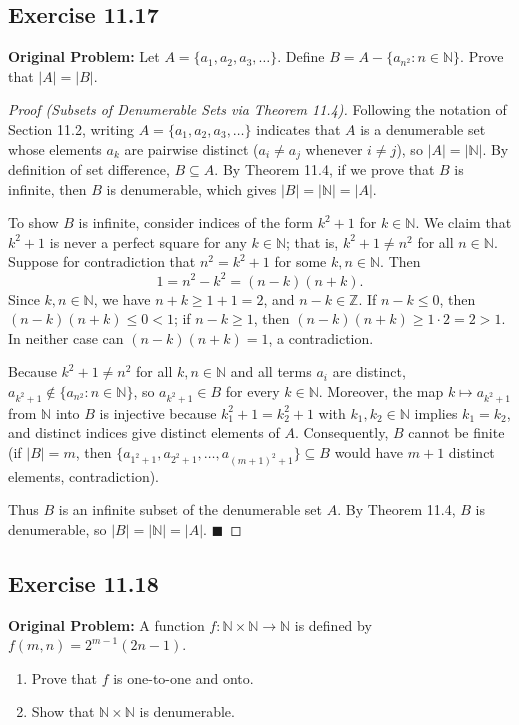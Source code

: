 \documentclass[11pt, letterpaper]{article}
\theoremstyle{definition}
\theoremstyle{remark}
\begin{document}
\subsection*{Exercise 11.17}
\textbf{Original Problem:} Let $A = \{a_1, a_2, a_3, \dots\}$. Define $B = A - \{a_{n^2} : n \in \mathbb{N}\}$. Prove that $|A| = |B|$.

\begin{proof}[Proof (Subsets of Denumerable Sets via Theorem 11.4)]
Following the notation of Section 11.2, writing $A = \{a_1, a_2, a_3, \dots\}$ indicates that $A$ is a denumerable set whose elements $a_k$ are pairwise distinct ($a_i \neq a_j$ whenever $i \neq j$), so $|A| = |\mathbb{N}|$. By definition of set difference, $B \subseteq A$. By Theorem 11.4, if we prove that $B$ is infinite, then $B$ is denumerable, which gives $|B| = |\mathbb{N}| = |A|$.

To show $B$ is infinite, consider indices of the form $k^2 + 1$ for $k \in \mathbb{N}$. We claim that $k^2 + 1$ is never a perfect square for any $k \in \mathbb{N}$; that is, $k^2 + 1 \neq n^2$ for all $n \in \mathbb{N}$. Suppose for contradiction that $n^2 = k^2 + 1$ for some $k, n \in \mathbb{N}$. Then
\[
1 = n^2 - k^2 = (n - k)(n + k).
\]
Since $k, n \in \mathbb{N}$, we have $n + k \geq 1 + 1 = 2$, and $n - k \in \mathbb{Z}$. If $n - k \leq 0$, then $(n - k)(n + k) \leq 0 < 1$; if $n - k \geq 1$, then $(n - k)(n + k) \geq 1 \cdot 2 = 2 > 1$. In neither case can $(n - k)(n + k) = 1$, a contradiction.

Because $k^2 + 1 \neq n^2$ for all $k, n \in \mathbb{N}$ and all terms $a_i$ are distinct, $a_{k^2 + 1} \notin \{a_{n^2} : n \in \mathbb{N}\}$, so $a_{k^2 + 1} \in B$ for every $k \in \mathbb{N}$. Moreover, the map $k \mapsto a_{k^2 + 1}$ from $\mathbb{N}$ into $B$ is injective because $k_1^2 + 1 = k_2^2 + 1$ with $k_1, k_2 \in \mathbb{N}$ implies $k_1 = k_2$, and distinct indices give distinct elements of $A$. Consequently, $B$ cannot be finite (if $|B| = m$, then $\{a_{1^2+1}, a_{2^2+1}, \dots, a_{(m+1)^2+1}\} \subseteq B$ would have $m + 1$ distinct elements, contradiction).

Thus $B$ is an infinite subset of the denumerable set $A$. By Theorem 11.4, $B$ is denumerable, so $|B| = |\mathbb{N}| = |A|$. $\blacksquare$
\end{proof}

\subsection*{Exercise 11.18}
\textbf{Original Problem:} A function $f : \mathbb{N} \times \mathbb{N} \to \mathbb{N}$ is defined by $f(m, n) = 2^{m - 1}(2n - 1)$.
\begin{enumerate}[label=(\alph*)]
    \item Prove that $f$ is one-to-one and onto.
    \item Show that $\mathbb{N} \times \mathbb{N}$ is denumerable.
\end{enumerate}
\end{document}
